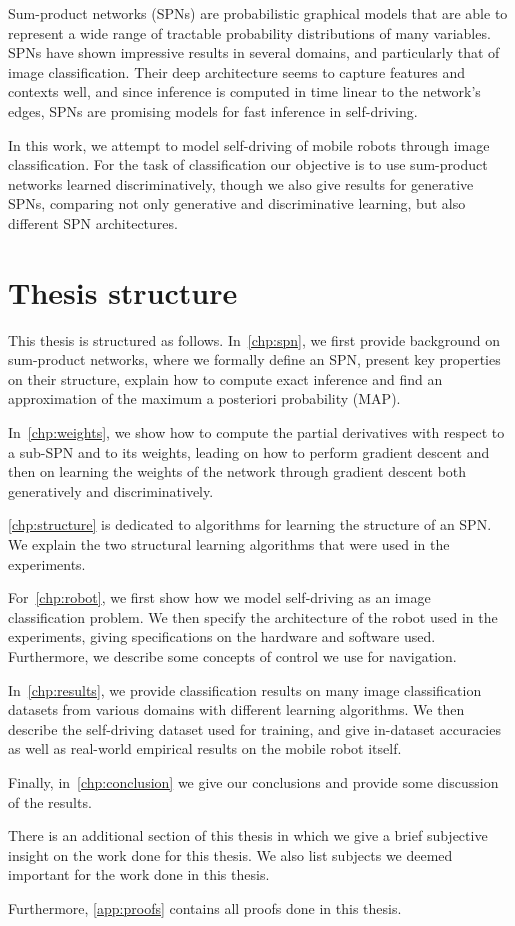 Sum-product networks (SPNs) are probabilistic graphical models that are able to represent a wide
range of tractable probability distributions of many variables. SPNs have shown impressive results
in several domains, and particularly that of image classification. Their deep architecture seems to
capture features and contexts well, and since inference is computed in time linear to the network's
edges, SPNs are promising models for fast inference in self-driving.

In this work, we attempt to model self-driving of mobile robots through image classification. For
the task of classification our objective is to use sum-product networks learned discriminatively,
though we also give results for generative SPNs, comparing not only generative and discriminative
learning, but also different SPN architectures.

\section{Thesis structure}

This thesis is structured as follows. In~\autoref{chp:spn}, we first provide background on
sum-product networks, where we formally define an SPN, present key properties on their structure,
explain how to compute exact inference and find an approximation of the maximum a posteriori
probability (MAP).

In~\autoref{chp:weights}, we show how to compute the partial derivatives with respect to a sub-SPN
and to its weights, leading on how to perform gradient descent and then on learning the weights of
the network through gradient descent both generatively and discriminatively.

\autoref{chp:structure} is dedicated to algorithms for learning the structure of an SPN\@. We
explain the two structural learning algorithms that were used in the experiments.

For~\autoref{chp:robot}, we first show how we model self-driving as an image classification
problem. We then specify the architecture of the robot used in the experiments, giving
specifications on the hardware and software used. Furthermore, we describe some concepts of control
we use for navigation.

In~\autoref{chp:results}, we provide classification results on many image classification datasets
from various domains with different learning algorithms. We then describe the self-driving dataset
used for training, and give in-dataset accuracies as well as real-world empirical results on the
mobile robot itself.

Finally, in~\autoref{chp:conclusion} we give our conclusions and provide some discussion of the
results.

There is an additional section of this thesis in which we give a brief subjective insight on the
work done for this thesis. We also list subjects we deemed important for the work done in this
thesis.

Furthermore, \autoref{app:proofs} contains all proofs done in this thesis.

